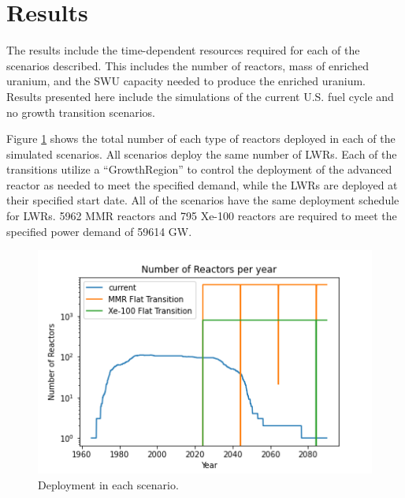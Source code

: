 \section{Results}

The results include the time-dependent resources required 
for each of the scenarios described. This includes 
the number of reactors, mass of enriched uranium, and the 
\gls{SWU} capacity needed to produce the enriched uranium.
Results presented here include the simulations of the 
current U.S. fuel cycle and no growth transition scenarios. 

Figure \ref{fig:rx_deployment} shows the total number 
of each type of reactors deployed in each of the simulated 
scenarios. All scenarios deploy the same number of \gls{LWR}s. 
Each of the transitions utilize a \Cycamore ``GrowthRegion'' 
to control the deployment of the advanced reactor as needed 
to meet the specified demand, while the \gls{LWR}s are 
deployed at their specified start date. All of the scenarios 
have the same deployment schedule for \gls{LWR}s. 5962 
\gls{MMR} reactors  and 795 Xe-100 reactors are required 
to meet the specified power demand of 59614 GW. 


\begin{figure}[ht]
    \centering
    \includegraphics[scale=0.5]{figures/rx_deployment_all.png}
    \caption{Deployment  in each scenario.}
    \label{fig:rx_deployment}
\end{figure}


